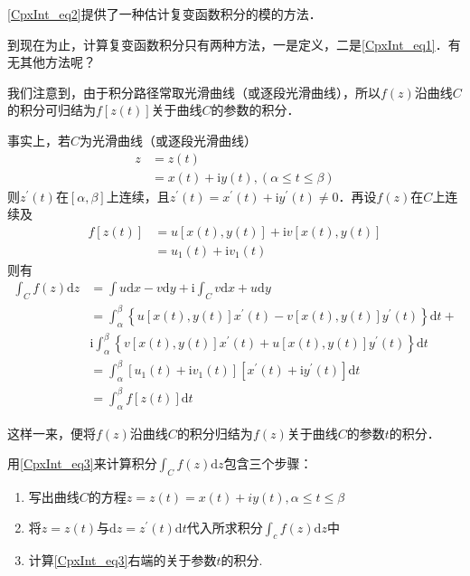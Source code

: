 \autoref{CpxInt_eq2}提供了一种估计复变函数积分的模的方法．

到现在为止，计算复变函数积分只有两种方法，一是定义，二是\autoref{CpxInt_eq1}．有无其他方法呢？

我们注意到，由于积分路径常取光滑曲线（或逐段光滑曲线），所以$ f (z) $沿曲线$C $的积分可归结为$f [z(t)]$关于曲线$C$的参数的积分．

事实上，若$C$为光滑曲线（或逐段光滑曲线）
\begin{equation}
\begin{aligned} z &=z(t) \\ &=x(t)+\mathrm{i} y(t),(\alpha \leqslant t \leqslant \beta) \end{aligned}
\end{equation}
则$z^\prime(t)$在$[α ,β ]$上连续，且$z^\prime(t) = x^\prime(t) + \mathrm iy^\prime(t) \neq  0$．再设$ f (z)$在$C$上连续及
\begin{equation}
\begin{aligned} f[z(t)] &=u[x(t), y(t)]+\mathrm{i} v[x(t), y(t)] \\ &=u_{1}(t)+\mathrm{i} v_{1}(t) \end{aligned}
\end{equation}
则有
\begin{equation} \label{CpxInt_eq3}
\begin{aligned} \int_{C} f(z) \mathrm{d} z &=\int u \mathrm{d} x-v \mathrm{d} y+\mathrm{i} \int_{C} v \mathrm{d} x+u \mathrm{d} y \\ &=\int_{\alpha}^{\beta}\left\{u[x(t), y(t)] x^{\prime}(t)-v[x(t), y(t)] y^{\prime}(t)\right\} \mathrm{d} t+\\ & \mathrm{i} \int_{\alpha}^{\beta}\left\{v[x(t), y(t)] x^{\prime}(t)+u[x(t), y(t)] y^{\prime}(t)\right\} \mathrm{d} t \\ &=\int_{\alpha}^{\beta}\left[u_{1}(t)+\mathrm{i} v_{1}(t)\right]\left[x^{\prime}(t)+\mathrm{i} y^{\prime}(t)\right] \mathrm{d} t \\ &=\int_{\alpha}^{\beta} f[z(t)] \mathrm{d} t \end{aligned}
\end{equation}

这样一来，便将$ f (z)$沿曲线$C$的积分归结为$ f (z)$关于曲线$C$的参数$t$的积分．

用\autoref{CpxInt_eq3}来计算积分$\displaystyle \int_{C} f(z) \mathrm{d} z$包含三个步骤：
\begin{enumerate}
\item 写出曲线$C$的方程$z=z(t)=x(t)+i y(t), \alpha \leqslant t \leqslant \beta$
\item 将$ z = z(t)$与$\mathrm{d}z = z^\prime (t)\mathrm{d}t $代入所求积分$\displaystyle \int_{c} f(z) \mathrm{d} z$中
\item 计算\autoref{CpxInt_eq3}右端的关于参数$t $的积分.
\end{enumerate}

